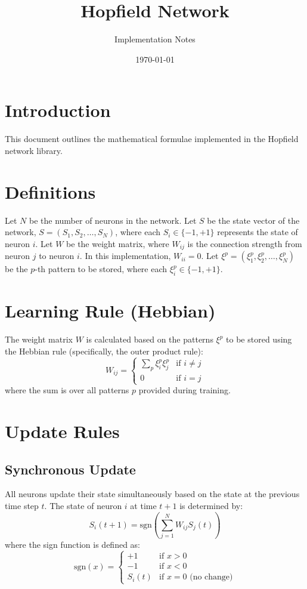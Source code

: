 \documentclass{article}
\title{Hopfield Network}
\author{Implementation Notes}
\date{\today}
\begin{document}
\maketitle

\section{Introduction}
This document outlines the mathematical formulae implemented in the Hopfield network library.

\section{Definitions}
Let $N$ be the number of neurons in the network.
Let $S$ be the state vector of the network, $S = (S_1, S_2, \dots, S_N)$, where each $S_i \in \{-1, +1\}$ represents the state of neuron $i$.
Let $W$ be the weight matrix, where $W_{ij}$ is the connection strength from neuron $j$ to neuron $i$. In this implementation, $W_{ii} = 0$.
Let $\xi^p = (\xi_1^p, \xi_2^p, \dots, \xi_N^p)$ be the $p$-th pattern to be stored, where each $\xi_i^p \in \{-1, +1\}$.

\section{Learning Rule (Hebbian)}
The weight matrix $W$ is calculated based on the patterns $\xi^p$ to be stored using the Hebbian rule (specifically, the outer product rule):
\[
W_{ij} = \begin{cases} \sum_{p} \xi_i^p \xi_j^p & \text{if } i \neq j \\ 0 & \text{if } i = j \end{cases}
\]
where the sum is over all patterns $p$ provided during training.

\section{Update Rules}

\subsection{Synchronous Update}
All neurons update their state simultaneously based on the state at the previous time step $t$. The state of neuron $i$ at time $t+1$ is determined by:
\[
S_i(t+1) = \text{sgn} \left( \sum_{j=1}^{N} W_{ij} S_j(t) \right)
\]
where the sign function is defined as:
\[
\text{sgn}(x) = \begin{cases} +1 & \text{if } x > 0 \\ -1 & \text{if } x < 0 \\ S_i(t) & \text{if } x = 0 \text{ (no change)} \end{cases}
\]
\end{document}
